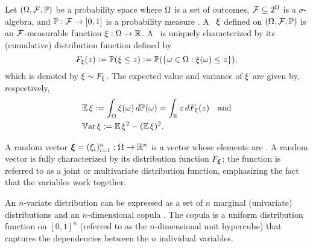 Let $(\Omega, \mathcal{F}, \mathbb{P})$ be a probability space where $\Omega$ is a set of
outcomes, $\mathcal{F} \subseteq 2^\Omega$ is a $\sigma$-algebra, and
$\mathbb{P}: \mathcal{F} \to [0, 1]$ is a probability measure
\cite{durrett2010}. A \rv\ $\xi$ defined on $(\Omega, \mathcal{F}, \mathbb{P})$ is an
$\mathcal{F}$-measurable function $\xi: \Omega \to \mathbb{R}$. A \rv\ is
uniquely characterized by its (cumulative) distribution function defined by
\begin{equation*}
  F_\xi(z) := \mathbb{P}(\xi \leq z) := \mathbb{P}(\{ \omega \in \Omega: \xi(\omega) \leq z \}),
\end{equation*}
which is denoted by $\xi \sim F_\xi$. The expected value and variance
of $\xi$ are given by, respectively,
\begin{align}
  & \expectation{\h} := \int_\outcomes \h(\o) \, d\probabilityMeasure(\o) = \int_\real z \, d \distribution_\h(z) \hspace{1em} \text{and} \elab{expectation} \\
  & \variance{\h} := \expectation{\h^2} - (\expectation{\h})^2. \elab{variance}
\end{align}

A random vector $\bm{\xi} = (\xi_i)_{i = 1}^n: \Omega \to \mathbb{R}^n$ is a vector
whose elements are \rvs. A random vector is fully characterized by its
distribution function $F_{\bm{\xi}}$; the function is referred to as a
joint or multivariate distribution function, emphasizing the fact that the
variables work together.

An $n$-variate distribution can be expressed as a set of $n$ marginal
(univariate) distributions and an $n$-dimensional copula \cite{nelsen2006}. The
copula is a uniform distribution function on $[0, 1]^n$ (referred to as the
$n$-dimensional unit hypercube) that captures the dependencies between the $n$
individual variables.
